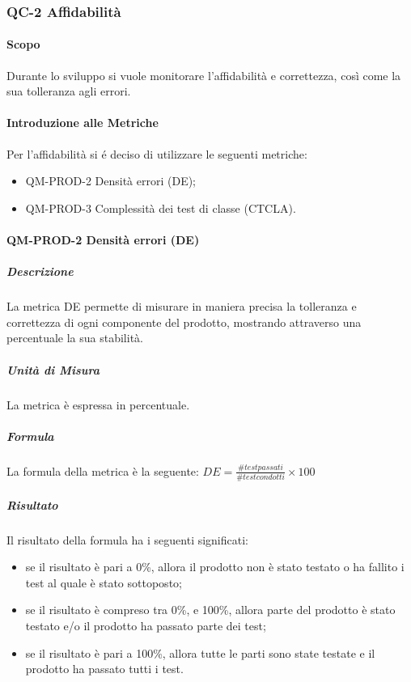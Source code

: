 		\subsubsection{QC-2 Affidabilità}
			\paragraph{Scopo}
			Durante lo sviluppo si vuole monitorare l'affidabilità e correttezza, così come la sua tolleranza agli errori.
			\paragraph{Introduzione alle Metriche}
				Per l'affidabilità si é deciso di utilizzare le seguenti metriche:
				\begin{itemize}
					\item QM-PROD-2 Densità errori (DE);
					\item QM-PROD-3 Complessità dei test di classe (CTCLA).
				\end{itemize}
			\paragraph{ QM-PROD-2 Densità errori (DE)}
				\subparagraph{Descrizione}
					La metrica DE permette di misurare in maniera precisa la tolleranza e correttezza di ogni componente del prodotto, mostrando attraverso una percentuale la sua stabilità.
				\subparagraph{Unità di Misura}
					La metrica è espressa in percentuale.
				\subparagraph{Formula}
					La formula della metrica è la seguente:
					\(DE = \frac{\# test passati}{\# test condotti}\times100\)
				\subparagraph{Risultato}
					Il risultato della formula ha i seguenti significati:
					\begin{itemize}
						\item se il risultato è pari a 0\%, allora il prodotto non è stato testato o ha fallito i test al quale è stato sottoposto;
						\item se il risultato è compreso tra 0\%, e 100\%, allora parte del prodotto è stato testato e/o il prodotto ha passato parte dei test;
						\item se il risultato è pari a 100\%, allora tutte le parti sono state testate e il prodotto ha passato tutti i test.
					\end{itemize}

